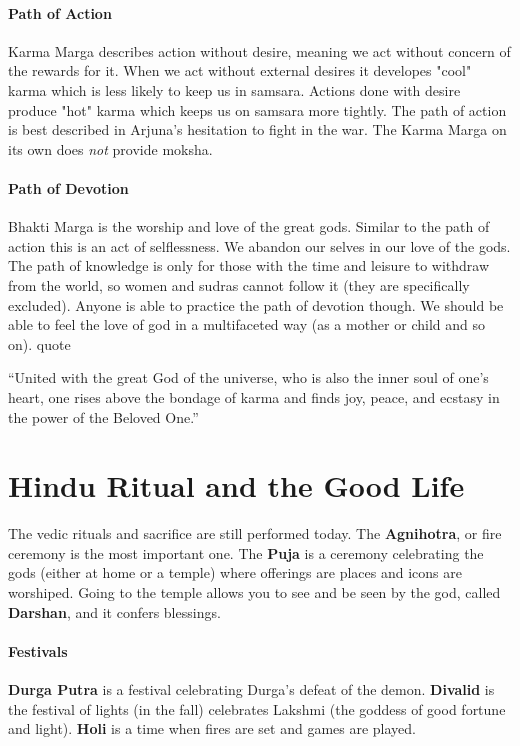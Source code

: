 \documentclass{article}
\begin{document}
\paragraph{Path of Action}
\label{par:path_of_action}
Karma Marga describes action without desire, meaning we act without concern of the rewards for it. When we act without external desires it developes "cool" karma which is less likely to keep us in samsara. Actions done with desire produce "hot" karma which keeps us on samsara more tightly. The path of action is best described in Arjuna's hesitation to fight in the war. The Karma Marga on its own does \emph{not} provide moksha.

\paragraph{Path of Devotion}
\label{par:path_of_devotion}
Bhakti Marga is the worship and love of the great gods. Similar to the path of action this is an act of selflessness. We abandon our selves in our love of the gods. The path of knowledge is only for those with the time and leisure to withdraw from the world, so women and sudras cannot follow it (they are specifically excluded). Anyone is able to practice the path of devotion though. We should be able to feel the love of god in a multifaceted way (as a mother or child and so on). quote
\begin{displayquote}
``United with the great God of the universe, who is also the inner soul of one's heart, one rises above the bondage of karma and finds joy, peace, and ecstasy in the power of the Beloved One.''
\end{displayquote}

\section*{Hindu Ritual and the Good Life}
\label{sec:hindu_ritual_and_the_good_life}
The vedic rituals and sacrifice are still performed today. The \textbf{Agnihotra}, or fire ceremony is the most important one. The \textbf{Puja} is a ceremony celebrating the gods (either at home or a temple) where offerings are places and icons are worshiped. Going to the temple allows you to see and be seen by the god, called \textbf{Darshan}, and it confers blessings.

\paragraph{Festivals}
\label{par:festivals}
\textbf{Durga Putra} is a festival celebrating Durga's defeat of the demon. \textbf{Divalid} is the festival of lights (in the fall) celebrates Lakshmi (the goddess of good fortune and light). \textbf{Holi} is a time when fires are set and games are played.
\end{document}
